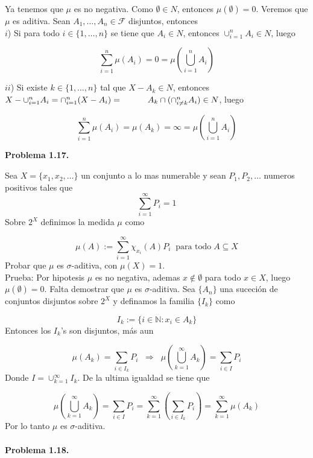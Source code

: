 \documentclass[12pt]{article}
\begin{document}
    Ya tenemos que $\mu$ es no negativa. Como $\emptyset\in N$, entonces $\mu(\emptyset) = 0$.
    Veremos que $\mu$ es aditiva. Sean $A_1,\ldots,A_n\in \mathcal{F}$ disjuntos, entonces 
    \\

    $i$) Si para todo $i\in \{1,\ldots,n\}$ se tiene que $A_i\in N$, entonces 
    $\cup_{i=1}^n A_i \in N$, luego
    
    \[\sum_{i=1}^n\mu(A_i) = 0 = \mu\left(\bigcup_{i=1}^n A_i\right)\]

    $ii$) Si existe $k\in \{1,\ldots,n\}$ tal que  $X-A_k\in N$, entonces
    $X-\cup_{i=1}^n A_i= \cap_{i=1}^n(X-A_i) = \hspace*{30pt} A_k\cap(\cap_{i\neq k}^n A_i)\in N$, luego
    
    \[\sum_{i=1}^n \mu(A_i) = \mu(A_k) = \infty = \mu \left(\bigcup_{i=1}^n A_i\right)\]
    \newpage

    \textbf{Problema 1.17.}

    Sea $X = \{x_1,x_2,\ldots\}$ un conjunto a lo mas numerable y sean $P_1,P_2,\ldots$ 
    numeros positivos tales que 
    \[\sum_{i=1}^{\infty} P_i = 1\]
    Sobre $2^X$ definimos la medida $\mu$ como

    \[\mu(A) := \sum_{i=1}^\infty \chi_{x_i}(A)P_i \;\; \text{para todo}\; A\subseteq X\]
    Probar que $\mu$ es $\sigma$-aditiva, con $\mu(X) = 1$.
    \\

    Prueba: Por hipotesis $\mu$ es no negativa, ademas $x\notin \emptyset$ para todo 
    $x\in X$, luego $\mu(\emptyset) = 0$. Falta demostrar que $\mu$ es $\sigma$-aditiva.
    Sea $\{A_n\}$ una suceci\'on de conjuntos disjuntos sobre $2^X$ y definamos la familia
    $\{I_k\}$ como

    \[I_k := \{i\in \mathbb{N} : x_i\in A_k\}\]
    Entonces los $I_k$'s son disjuntos, m\'as aun

    \[\mu(A_k) = \sum_{i\in I_k}P_i\;\; \Rightarrow\;\; \mu\left(\bigcup_{k=1}^{\infty}A_k\right) = \sum_{i\in I}P_i\]
    Donde $I = \cup_{k=1}^{\infty} I_k$. De la ultima igualdad se tiene que 

    \[\mu\left(\bigcup_{k=1}^{\infty}A_k\right) = \sum_{i\in I}P_i = \sum_{k=1}^{\infty} \left(\sum_{i\in I_k}P_i\right) = \sum_{k=1}^{\infty}\mu(A_k)\]
    Por lo tanto $\mu$ es $\sigma$-aditiva.
    \\ \\

    \textbf{Problema 1.18.}
\end{document}
